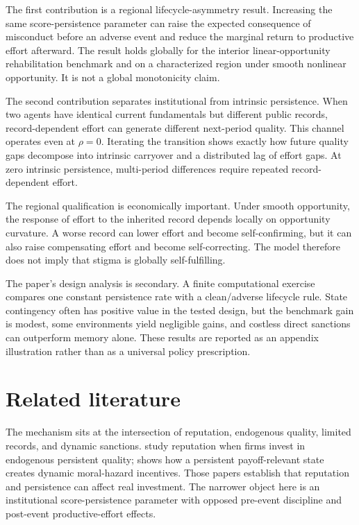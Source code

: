 \documentclass[11pt]{article}
\begin{document}
The first contribution is a regional lifecycle-asymmetry result. Increasing the same score-persistence parameter can raise the expected consequence of misconduct before an adverse event and reduce the marginal return to productive effort afterward. The result holds globally for the interior linear-opportunity rehabilitation benchmark and on a characterized region under smooth nonlinear opportunity. It is not a global monotonicity claim.

The second contribution separates institutional from intrinsic persistence. When two agents have identical current fundamentals but different public records, record-dependent effort can generate different next-period quality. This channel operates even at $\rho=0$. Iterating the transition shows exactly how future quality gaps decompose into intrinsic carryover and a distributed lag of effort gaps. At zero intrinsic persistence, multi-period differences require repeated record-dependent effort.

The regional qualification is economically important. Under smooth opportunity, the response of effort to the inherited record depends locally on opportunity curvature. A worse record can lower effort and become self-confirming, but it can also raise compensating effort and become self-correcting. The model therefore does not imply that stigma is globally self-fulfilling.

The paper's design analysis is secondary. A finite computational exercise compares one constant persistence rate with a clean/adverse lifecycle rule. State contingency often has positive value in the tested design, but the benchmark gain is modest, some environments yield negligible gains, and costless direct sanctions can outperform memory alone. These results are reported as an appendix illustration rather than as a universal policy prescription.

\section{Related literature}

The mechanism sits at the intersection of reputation, endogenous quality, limited records, and dynamic sanctions. \citet{boardmeyer2013} study reputation when firms invest in endogenous persistent quality; \citet{bohren2024} shows how a persistent payoff-relevant state creates dynamic moral-hazard incentives. Those papers establish that reputation and persistence can affect real investment. The narrower object here is an institutional score-persistence parameter with opposed pre-event discipline and post-event productive-effort effects.
\end{document}
